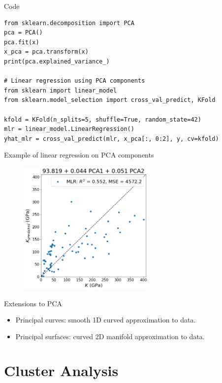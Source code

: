 \documentclass{beamer}
\begin{document}
\begin{frame}[fragile]{Code}
\begin{verbatim}
from sklearn.decomposition import PCA
pca = PCA()
pca.fit(x)
x_pca = pca.transform(x)
print(pca.explained_variance_)

# Linear regression using PCA components
from sklearn import linear_model
from sklearn.model_selection import cross_val_predict, KFold

kfold = KFold(n_splits=5, shuffle=True, random_state=42)
mlr = linear_model.LinearRegression()
yhat_mlr = cross_val_predict(mlr, x_pca[:, 0:2], y, cv=kfold)
\end{verbatim}
\end{frame} 


\begin{frame}{Example of linear regression on PCA components}
\begin{figure}
    \centering
    \includegraphics[width=0.6\textwidth]{figures/pca-regression.png}
\end{figure}
\end{frame} 

\begin{frame}{Extensions to PCA}
    \begin{itemize}
        \item Principal curves: smooth 1D curved approximation to data.
        \item Principal surfaces: curved 2D manifold approximation to data.
    \end{itemize}
\end{frame}

\section{Cluster Analysis}
\end{document}
